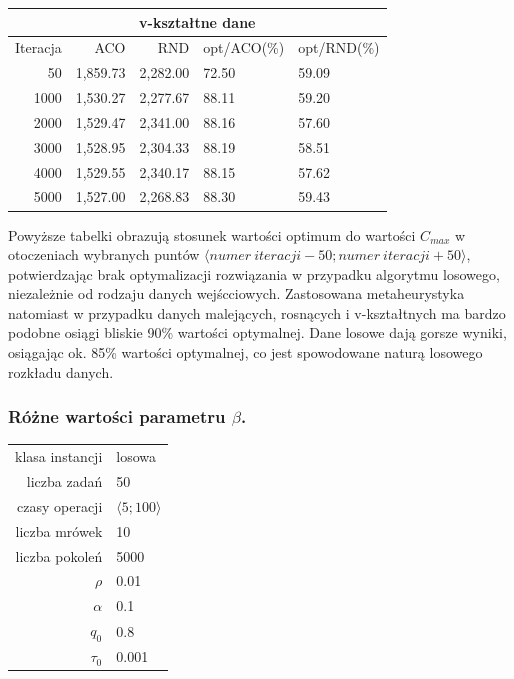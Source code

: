 \documentclass[10pt,a4paper]{article}
\begin{document}
\begin{center}
\begin{tabular}{rrrll}
\bottomrule
\end{tabular}

\begin{tabular}{rrrll}
\toprule
\multicolumn{5}{c}{v-kształtne dane}\\
\midrule
Iteracja & ACO & RND  & opt/ACO(\%) & opt/RND(\%) \\
\midrule
50	& 1,859.73	& 2,282.00	& 72.50 &	59.09\\
1000	& 1,530.27	& 2,277.67	& 88.11 &	59.20\\
2000	& 1,529.47	& 2,341.00 &	88.16 &	57.60\\
3000	& 1,528.95	& 2,304.33 &	88.19 &	58.51\\
4000	& 1,529.55	& 2,340.17 &	88.15 &	57.62\\
5000	& 1,527.00	& 2,268.83 & 88.30 &	59.43\\

\bottomrule
\end{tabular}
\end{center}

\vspace{15mm}
Powyższe tabelki obrazują stosunek wartości optimum do wartości $C_{max}$ w otoczeniach wybranych puntów $\langle numer\ iteracji - 50 ; numer\ iteracji + 50\rangle$, potwierdzając brak optymalizacji rozwiązania w przypadku algorytmu losowego, niezależnie od rodzaju danych wejścciowych.
Zastosowana metaheurystyka natomiast w przypadku danych malejących, rosnących i v-kształtnych ma bardzo podobne osiągi bliskie 90\% wartości optymalnej.
Dane losowe dają gorsze wyniki, osiągając ok. 85\% wartości optymalnej, co jest spowodowane naturą losowego rozkładu danych.


\newpage
\subsubsection{Różne wartości parametru $\beta$.}
\vspace{6 mm}
\begin{center}
\begin{tabular}{|r|l|}
  \hline
  klasa instancji & losowa \\
  liczba zadań & 50 \\
  czasy operacji & $ \langle 5;100 \rangle $  \\
  liczba mrówek & 10 \\
  liczba pokoleń & 5000 \\
  $ \rho $ & 0.01 \\
  $ \alpha $ & 0.1 \\
  $ q_0 $ & 0.8 \\
  $ \tau_0 $ & 0.001 \\
  \hline
\end{tabular}
\end{center}
\end{document}
